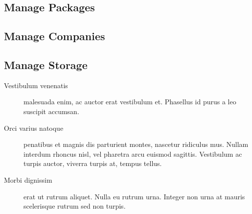 \subsection{Manage Packages}
\subsection{Manage Companies}
\subsection{Manage Storage}


\begin{description}
	\item[Vestibulum venenatis] malesuada enim, ac auctor erat vestibulum et. Phasellus id purus a leo suscipit accumsan.
	\item[Orci varius natoque] penatibus et magnis dis parturient montes, nascetur ridiculus mus. Nullam interdum rhoncus nisl, vel pharetra arcu euismod sagittis. Vestibulum ac turpis auctor, viverra turpis at, tempus tellus.
	\item[Morbi dignissim] erat ut rutrum aliquet. Nulla eu rutrum urna. Integer non urna at mauris scelerisque rutrum sed non turpis.
\end{description}